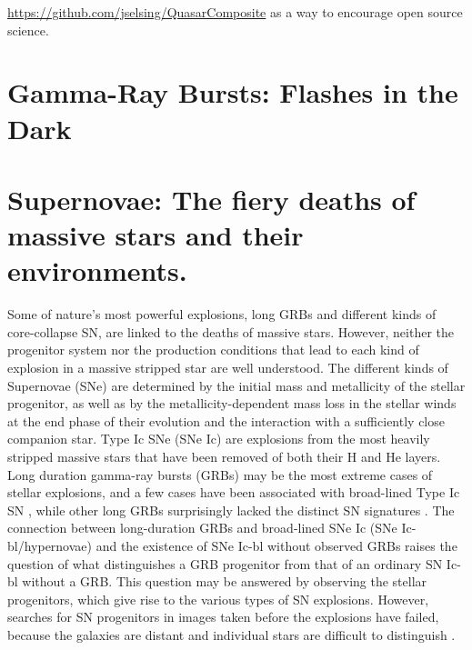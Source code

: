 \url{https://github.com/jselsing/QuasarComposite} as a way to encourage open source science.

\section{Gamma-Ray Bursts: Flashes in the Dark}
\label{sec:intro:grb}


\section{Supernovae: The fiery deaths of massive stars and their environments.}
\label{sec:intro:sn}

Some of nature's most powerful explosions, long
  GRBs and different kinds of core-collapse SN, are linked to the
  deaths of massive stars. However, neither the progenitor system nor
  the production conditions that lead to each kind of explosion in a
  massive stripped star are well understood. The different kinds of
  Supernovae (SNe) are determined by the initial mass and metallicity
  of the stellar progenitor, as well as by the metallicity-dependent
  mass loss in the stellar winds at the end phase of their evolution
  and the interaction with a sufficiently close companion star. Type
  Ic SNe (SNe Ic) are explosions from the most heavily stripped
  massive stars that have been removed of both their H and He
  layers. Long duration gamma-ray bursts (GRBs) may be the most
  extreme cases of stellar explosions, and a few cases have been
  associated with broad-lined Type Ic SN \citep{Woosley2006}, while other long GRBs
  surprisingly lacked the distinct SN signatures \citep{Fynbo2006}. The connection
  between long-duration GRBs and broad-lined SNe Ic (SNe
  Ic-bl/hypernovae) and the existence of SNe Ic-bl without observed
  GRBs raises the question of what distinguishes a GRB progenitor from
  that of an ordinary SN Ic-bl without a GRB. This question may be
  answered by observing the stellar progenitors, which give rise to
  the various types of SN explosions. However, searches for SN
  progenitors in images taken before the explosions have failed,
  because the galaxies are distant and individual stars are difficult
  to distinguish \citep{Maund2005}.

